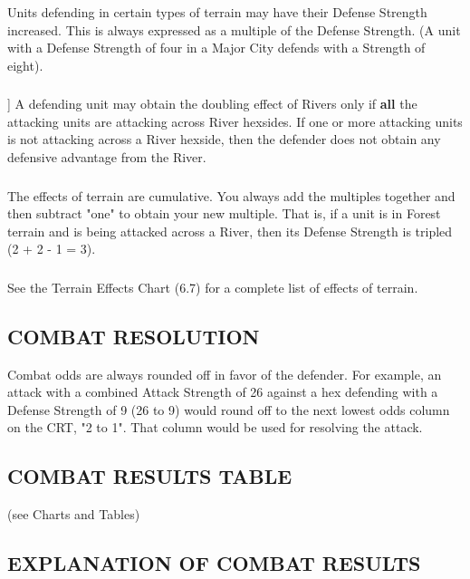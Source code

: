 \subsubsection{} Units defending in certain types of terrain may have their Defense Strength increased. This is always expressed as a multiple of the Defense Strength. (A unit with a Defense Strength of four in a Major City defends with a Strength of eight).

\subsubsection{}] A defending unit may obtain the doubling effect of Rivers only if \textbf{all} the attacking units are attacking across River hexsides. If one or more attacking units is not attacking across a River hexside, then the defender does not obtain any defensive advantage from the River.

\subsubsection{} The effects of terrain are cumulative. You always add the multiples together and then subtract "one" to obtain your new multiple. That is, if a unit is in Forest terrain and is being attacked across a River, then its Defense Strength is tripled (2 + 2 - 1 = 3).

\subsubsection{} See the Terrain Effects Chart (6.7) for a complete list of effects of terrain.

\subsection{COMBAT RESOLUTION}

Combat odds are always rounded off in favor of the defender. For example, an attack with a combined Attack Strength of 26 against a hex defending with a Defense Strength of 9 (26 to 9) would round off to the next lowest odds column on the CRT, "2 to 1". That column would be used for resolving the attack.

\subsection{COMBAT RESULTS TABLE} (see Charts and Tables)

\begin{flushleft}
  \subsection{EXPLANATION OF COMBAT RESULTS}
\end{flushleft}

